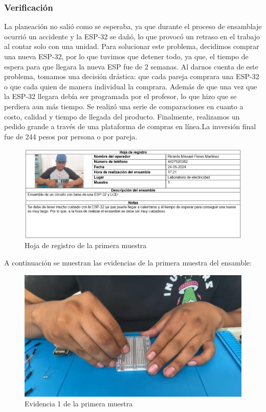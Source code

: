\subsubsection{Verificación}

La planeación no salió como se esperaba, ya que durante el proceso de ensamblaje ocurrió un accidente y la ESP-32 se dañó, lo que provocó un retraso en el trabajo al contar solo con una unidad. Para solucionar este problema, decidimos comprar una nueva ESP-32, por lo que tuvimos que detener todo, ya que, el tiempo de espera para que llegara la nueva ESP fue de 2 semanas. Al darnos cuenta de este problema, tomamos una decisión drástica: que cada pareja comprara una ESP-32 o que cada quien de manera individual la comprara. Además de que una vez que la ESP-32 llegara debía ser programada por el profesor, lo que hizo que se perdiera aun más tiempo. Se realizó una serie de comparaciones en cuanto a costo, calidad y tiempo de llegada del producto. Finalmente, realizamos un pedido grande a través de una plataforma de compras en línea.La inversión final fue de 244 pesos por persona o por pareja.

\begin{figure}[H]
        \centering
        \includegraphics[trim = {0mm 0mm 0mm 0mm},clip,scale=0.2]{10/Img/hojaRegistro1.png}
        \caption{Hoja de registro de la primera muestra}
        \label{hojaRegistro1}
    \end{figure}

A continuación se muestran las evidencias de la primera muestra del ensamble:

\begin{figure}[H]
        \centering
        \includegraphics[trim = {0mm 0mm 0mm 0mm},clip,scale=0.2]{10/Img/muestra1Prueba1.jpg}
        \caption{Evidencia 1 de la primera muestra}
        \label{muestra1Prueba1}
    \end{figure}


